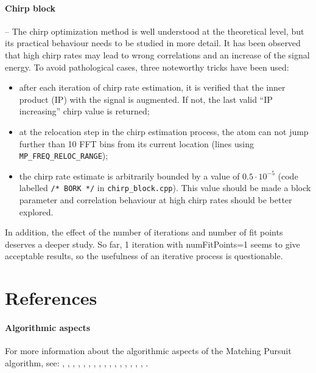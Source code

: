 \documentclass[11pt,a4paper]{article}
\begin{document}
\paragraph{Chirp block} -- The chirp optimization method is well understood
at the theoretical level, but its practical behaviour needs to be studied in
more detail. It has been observed that high chirp rates may lead to wrong
correlations and an increase of the signal energy. To avoid pathological cases,
three noteworthy tricks have been used:
\begin{itemize}
\item after each iteration of chirp rate estimation, it is verified that the
  inner product (IP) with the signal is augmented. If not, the last valid ``IP
  increasing'' chirp value is returned;
\item at the relocation step in the chirp estimation process, the atom can not
  jump further than 10 FFT bins from its current location (lines using
  \verb+MP_FREQ_RELOC_RANGE+);
\item the chirp rate estimate is arbitrarily bounded by a value of
$0.5\cdot10^{-5}$ (code labelled \verb+/* BORK */+ in \verb+chirp_block.cpp+).
This value should be made a block parameter and correlation behaviour at high
chirp rates should be better explored.
\end{itemize}
In addition, the effect of the number of iterations and number of fit points
deserves a deeper study. So far, 1 iteration with numFitPoints=1 seems to give
acceptable results, so the usefulness of an iterative process is questionable.



\clearpage
\section{References}
\paragraph{Algorithmic aspects} For more information about the algorithmic
aspects of the Matching Pursuit algorithm, see: \newline \cite{Zhang93},
\cite{MZ93}, \cite{PRK93}, \cite{Davis94}, \cite{Bergeaud},
\cite{BM96}, \cite{HRP}, \cite{HRMP1}, \cite{HRMP2}, \cite{DMA97},
\cite{goodwin99:_match}, \cite{MaThese}, \cite{Grib2001}, \linebreak
\cite{Grib2002a}, \cite{gribonval03:_harmon_decom_audio_signal_match_pursuit},
\cite{SPIE03:GribA}, \cite{IC06MPTK}.
\end{document}
